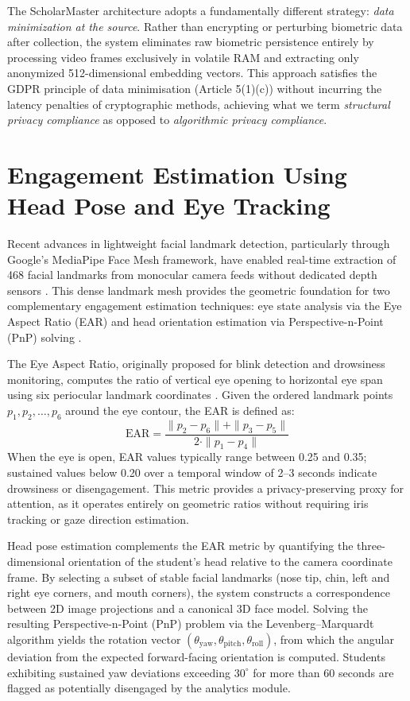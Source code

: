 \documentclass[12pt,a4paper,oneside]{report}
\begin{document}
The ScholarMaster architecture adopts a fundamentally different strategy: \textit{data minimization at the source}. Rather than encrypting or perturbing biometric data after collection, the system eliminates raw biometric persistence entirely by processing video frames exclusively in volatile RAM and extracting only anonymized 512-dimensional embedding vectors. This approach satisfies the GDPR principle of data minimisation (Article 5(1)(c)) without incurring the latency penalties of cryptographic methods, achieving what we term \textit{structural privacy compliance} as opposed to \textit{algorithmic privacy compliance}.

\section{Engagement Estimation Using Head Pose and Eye Tracking}
Recent advances in lightweight facial landmark detection, particularly through Google's MediaPipe Face Mesh framework, have enabled real-time extraction of 468 facial landmarks from monocular camera feeds without dedicated depth sensors \cite{murphy2009headpose, ruiz2018headpose}. This dense landmark mesh provides the geometric foundation for two complementary engagement estimation techniques: eye state analysis via the Eye Aspect Ratio (EAR) and head orientation estimation via Perspective-n-Point (PnP) solving \cite{whitehill2014engagement}.

The Eye Aspect Ratio, originally proposed for blink detection and drowsiness monitoring, computes the ratio of vertical eye opening to horizontal eye span using six periocular landmark coordinates \cite{soukupova2016ear}. Given the ordered landmark points $p_1, p_2, \ldots, p_6$ around the eye contour, the EAR is defined as:
\begin{equation}
    \text{EAR} = \frac{\|p_2 - p_6\| + \|p_3 - p_5\|}{2 \cdot \|p_1 - p_4\|}
\end{equation}
When the eye is open, EAR values typically range between 0.25 and 0.35; sustained values below 0.20 over a temporal window of 2--3 seconds indicate drowsiness or disengagement. This metric provides a privacy-preserving proxy for attention, as it operates entirely on geometric ratios without requiring iris tracking or gaze direction estimation.

Head pose estimation complements the EAR metric by quantifying the three-dimensional orientation of the student's head relative to the camera coordinate frame. By selecting a subset of stable facial landmarks (nose tip, chin, left and right eye corners, and mouth corners), the system constructs a correspondence between 2D image projections and a canonical 3D face model. Solving the resulting Perspective-n-Point (PnP) problem via the Levenberg--Marquardt algorithm yields the rotation vector $(\theta_{\text{yaw}}, \theta_{\text{pitch}}, \theta_{\text{roll}})$, from which the angular deviation from the expected forward-facing orientation is computed. Students exhibiting sustained yaw deviations exceeding $30^{\circ}$ for more than 60 seconds are flagged as potentially disengaged by the analytics module.
\end{document}
